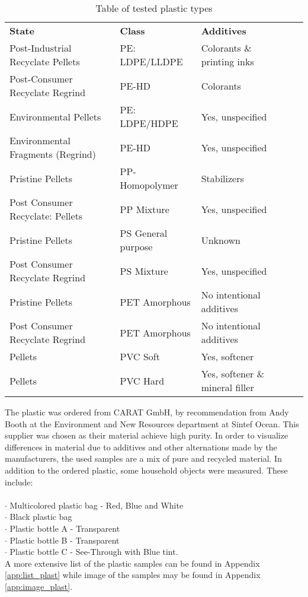 \begin{center}
\begin{table}[H]
\begin{tabular}{ |l|l|l|l|l| }
 \hline
 \textbf{State} & \textbf{Class} & \textbf{Additives}\\ 
Post-Industrial Recyclate Pellets & PE: LDPE/LLDPE & Colorants \& printing inks\\
Post-Consumer Recyclate Regrind & PE-HD & Colorants\\
Environmental Pellets & PE: LDPE/HDPE & Yes, unspecified\\
Environmental Fragments (Regrind) & PE-HD & Yes, unspecified\\
Pristine Pellets & PP-Homopolymer & Stabilizers\\
Post Consumer Recyclate: Pellets & PP Mixture & Yes, unspecified\\
Pristine Pellets & PS General purpose & Unknown\\
Post Consumer Recyclate Regrind & PS Mixture & Yes, unspecified\\ 
Pristine Pellets & PET Amorphous & No intentional additives\\
Post Consumer Recyclate Regrind & PET Amorphous & No intentional additives\\
Pellets & PVC Soft & Yes, softener\\
Pellets & PVC Hard & Yes, softener \& mineral filler\\
 \hline
\end{tabular}
\caption{Table of tested plastic types}
\label{tab:tested:plastic}
\end{table}
\end{center}
\noindent
The plastic was ordered from CARAT GmbH, by recommendation from Andy Booth at the Environment and New Resources department at Sintef Ocean. This supplier was chosen as their material achieve high purity. In order to visualize differences in material due to additives and other alternations made by the manufacturers, the used samples are a mix of pure and recycled material. In addition to the ordered plastic, some household objects were measured. These include:
\\\\
\noindent
$\cdot$ Multicolored plastic bag - Red, Blue and White\\
$\cdot$ Black plastic bag\\
$\cdot$ Plastic bottle A - Transparent\\
$\cdot$ Plastic bottle B - Transparent\\
$\cdot$ Plastic bottle C - See-Through with Blue tint.
\\
A more extensive list of the plastic samples can be found in Appendix \autoref{app:list_plast} while image of the samples may be found in Appendix \autoref{app:image_plast}.


